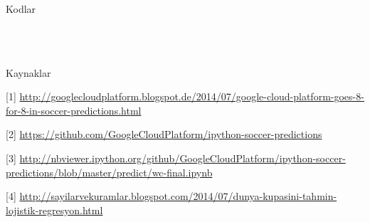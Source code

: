 \documentclass[12pt,fleqn]{article}\usepackage{../common}
\begin{document}
Kodlar

\inputminted[fontsize=\footnotesize]{python}{world_cup.py}

\inputminted[fontsize=\footnotesize]{python}{power.py}

\inputminted[fontsize=\footnotesize]{python}{features.py}

\inputminted[fontsize=\footnotesize]{python}{match_stats.py}

Kaynaklar

[1] \url{http://googlecloudplatform.blogspot.de/2014/07/google-cloud-platform-goes-8-for-8-in-soccer-predictions.html}

[2] \url{https://github.com/GoogleCloudPlatform/ipython-soccer-predictions}

[3] \url{http://nbviewer.ipython.org/github/GoogleCloudPlatform/ipython-soccer-predictions/blob/master/predict/wc-final.ipynb}

[4] \url{http://sayilarvekuramlar.blogspot.com/2014/07/dunya-kupasini-tahmin-lojistik-regresyon.html}
\end{document}

